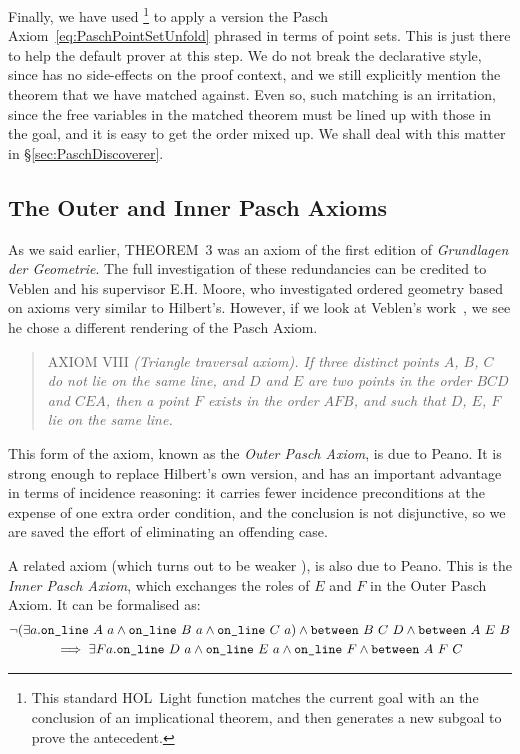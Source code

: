 Finally, we have used \footnote{This standard HOL~Light function matches the current goal with an the conclusion of an implicational theorem, and then generates a new subgoal to prove the antecedent.} to apply a version the Pasch Axiom~\eqref{eq:PaschPointSetUnfold} phrased in terms of point sets. This is just there to help the default prover at this step. We do not break the declarative style, since  has no side-effects on the proof context, and we still explicitly mention the theorem that we have matched against. Even so, such matching is an irritation, since the free variables in the matched theorem must be lined up with those in the goal, and it is easy to get the order mixed up. We shall deal with this matter in \S\ref{sec:PaschDiscoverer}.

\subsection{The Outer and Inner Pasch Axioms}
As we said earlier, THEOREM~3 was an axiom of the first edition of \emph{Grundlagen der Geometrie}. The full investigation of these redundancies can be credited to Veblen and his supervisor E.H. Moore, who investigated ordered geometry based on axioms very similar to Hilbert's. However, if we look at Veblen's work~\cite{Veblenphd}, we see he chose a different rendering of the Pasch Axiom.

\begin{quotation}
AXIOM VIII \emph{(Triangle traversal axiom). If three distinct points $A$, $B$, $C$ do not lie on the same line, and $D$ and $E$ are two points in the order $BCD$ and $CEA$, then a point $F$ exists in the order $AFB$, and such that $D$, $E$, $F$ lie on the same line.}
\end{quotation}

This form of the axiom, known as the \emph{Outer Pasch Axiom}, is due to Peano. It is strong enough to replace Hilbert's own version, and has an important advantage in terms of incidence reasoning: it carries fewer incidence preconditions at the expense of one extra order condition, and the conclusion is not disjunctive, so we are saved the effort of eliminating an offending case.

A related axiom (which turns out to be weaker \cite{PaschForms}), is also due to Peano. This is the \emph{Inner Pasch Axiom}, which exchanges the roles of $E$ and $F$ in the Outer Pasch Axiom. It can be formalised as:
\begin{multline}\label{eq:InnerPaschWeak}
  \neg(\exists a.\texttt{on\_line}\ A\ a\wedge \texttt{on\_line}\ B\ a\wedge \texttt{on\_line}\ C\ a) \wedge \texttt{between}\ B\ C\ D \wedge \texttt{between}\ A\ E\ B\\ \implies \exists F a.  \texttt{on\_line}\ D\ a \wedge \texttt{on\_line}\ E\ a \wedge \texttt{on\_line}\ F \wedge \texttt{between}\ A\ F\ C
\end{multline}

